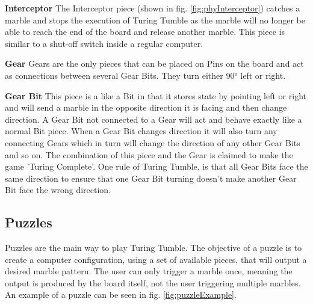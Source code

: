 \documentclass{l4proj}
\begin{document}
\textbf{Interceptor}
The Interceptor piece (shown in fig. \ref{fig:phyInterceptor}) catches a marble and stops the execution of Turing Tumble as the marble will no longer be able to reach the end of the board and release another marble. This piece is similar to a shut-off switch inside a regular computer. 

\textbf{Gear}
Gears are the only pieces that can be placed on Pins on the board and act as connections between several Gear Bits. They turn either 90° left or right. 

\textbf{Gear Bit}
This piece is a like a Bit in that it stores state by pointing left or right and will send a marble in the opposite direction it is facing and then change direction. A Gear Bit not connected to a Gear will act and behave exactly like a normal Bit piece. When a Gear Bit changes direction it will also turn any connecting Gears which in turn will change the direction of any other Gear Bits and so on. The combination of this piece and the Gear is claimed to make the game 'Turing Complete'. One rule of Turing Tumble, is that all Gear Bits face the same direction to ensure that one Gear Bit turning doesn't make another Gear Bit face the wrong direction.


\subsection{Puzzles}
\label{section:puzzle-background}
Puzzles are the main way to play Turing Tumble. The objective of a puzzle is to create a computer configuration, using a set of available pieces, that will output a desired marble pattern. The user can only trigger a marble once, meaning the output is produced by the board itself, not the user triggering multiple marbles. An example of a puzzle can be seen in fig. \ref{fig:puzzleExample}.  
\end{document}
